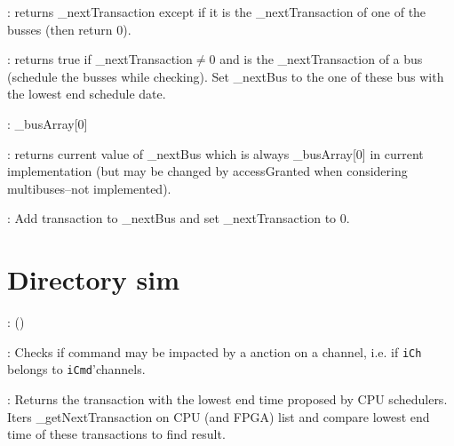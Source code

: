 \documentclass[a4paper,11pt]{article}
\newcommand{\bfont}{\fontseries{b}\selectfont}
\newcommand{\cod}[1]{{\ttfamily #1}}
\newcommand{\class}[2]{\par\vspace{1mm}\hspace{-5mm}\large\colorbox{file}{\textbullet\bfont\cod{#1}:} (\cod{#2})\par}
\newcommand{\method}[1]{\par\vspace{1mm}\hspace{-2mm}\colorbox{method}{\textopenbullet\bfont\cod{#1}:}}
\begin{document}
\method{getNextTransaction(iEndSchedule)} returns \cod{\_nextTransaction} except if it is the \cod{\_nextTransaction} of one of the busses (then return 0).

\method{accessGranted()} returns true if \cod{\_nextTransaction}$\neq$0 and is the \cod{\_nextTransaction} of a bus (schedule the busses while checking). Set \cod{\_nextBus} to the one of these bus with the lowest end schedule date. 

\method{getBus()} \cod{\_busArray[0]}

\method{getNextBus()} returns current value of \cod{\_nextBus} which is always \cod{\_busArray[0]} in current implementation (but may be changed by \cod{accessGranted} when considering multibuses--not implemented).

\method{addTransaction(iTransToBeAdded)} Add transaction to \cod{\_nextBus} and set \cod{\_next\-Tran\-saction} to 0.

\section*{Directory \cod{sim}}
\class{Simulator}{}

\method{channelImpactsCommand(iCh,iCmd)} Checks if command may be impacted by a anction on a channel, i.e. if {\tt iCh} belongs to {\tt iCmd}'channels.

\method{getTransLowestEndTime(oResultDevice)} Returns the transaction with the lowest end time proposed by CPU schedulers. Iters \cod{\_getNextTransaction} on CPU (and FPGA) list and compare lowest end time of these transactions to find result.
\end{document}
